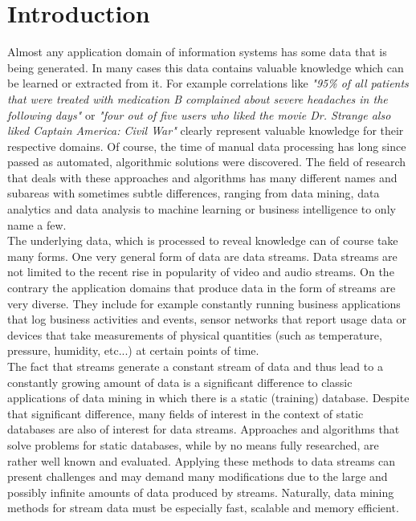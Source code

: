 
\chapter{Introduction}  %

\ifpdf
    \graphicspath{{Chapter1/Figs/Raster/}{Chapter1/Figs/PDF/}{Chapter1/Figs/}}
\else
    \graphicspath{{Chapter1/Figs/Vector/}{Chapter1/Figs/}}
\fi

Almost any application domain of information systems has some data that is being generated. In many cases this data contains valuable knowledge which can be learned or extracted from it. For example correlations like \textit{"95\% of all patients that were treated with medication B complained about severe headaches in the following days"} or \textit{"four out of five users who liked the movie Dr. Strange also liked Captain America: Civil War"} clearly represent valuable knowledge for their respective domains. Of course, the time of manual data processing has long since passed as automated, algorithmic solutions were discovered. The field of research that deals with these approaches and algorithms has many different names and subareas with sometimes subtle differences, ranging from data mining, data analytics and data analysis to machine learning or business intelligence to only name a few. \\
The underlying data, which is processed to reveal knowledge can of course take many forms. One very general form of data are data streams. Data streams are not limited to the recent rise in popularity of video and audio streams. On the contrary the application domains that produce data in the form of streams are very diverse. They include for example constantly running business applications that log business activities and events, sensor networks that report usage data or devices that take measurements of physical quantities (such as temperature, pressure, humidity, etc...) at certain points of time. \\
The fact that streams generate a constant stream of data and thus lead to a constantly growing amount of data is a significant difference to classic applications of data mining in which there is a static (training) database. Despite that significant difference, many fields of interest in the context of static databases are also of interest for data streams. Approaches and algorithms that solve problems for static databases, while by no means fully researched, are rather well known and evaluated. Applying these methods to data streams can present challenges and may demand many modifications due to the large and possibly infinite amounts of data produced by streams. Naturally, data mining methods for stream data must be especially fast, scalable and memory efficient. \newline
